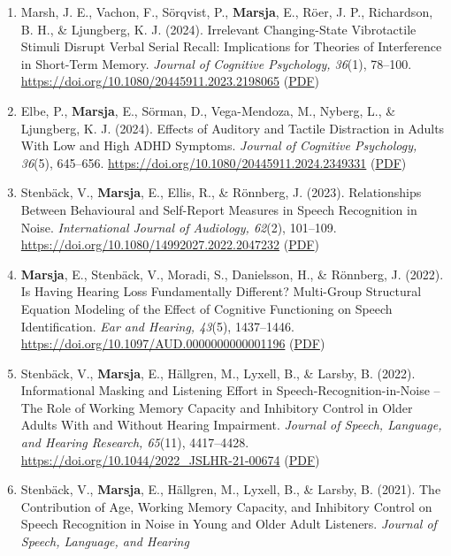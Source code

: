 \documentclass[]{article}
\begin{document}
\begin{enumerate}
  Classification. \emph{Acta Psychologica, 259}, 105461.
  \url{https://doi.org/10.1016/j.actpsy.2025.105461}
  (\href{https://tinyurl.com/spinml}{PDF})
\item
  Marsh, J. E., Vachon, F., Sörqvist, P., \textbf{Marsja}, E., Röer, J.
  P., Richardson, B. H., \& Ljungberg, K. J. (2024). Irrelevant
  Changing-State Vibrotactile Stimuli Disrupt Verbal Serial Recall:
  Implications for Theories of Interference in Short-Term Memory.
  \emph{Journal of Cognitive Psychology, 36}(1), 78--100.
  \url{https://doi.org/10.1080/20445911.2023.2198065}
  (\href{https://tinyurl.com/vibradistr}{PDF})
\item
  Elbe, P., \textbf{Marsja}, E., Sörman, D., Vega-Mendoza, M., Nyberg,
  L., \& Ljungberg, K. J. (2024). Effects of Auditory and Tactile
  Distraction in Adults With Low and High ADHD Symptoms. \emph{Journal
  of Cognitive Psychology, 36}(5), 645--656.
  \url{https://doi.org/10.1080/20445911.2024.2349331}
  (\href{https://tinyurl.com/elbevibra}{PDF})
\item
  Stenbäck, V., \textbf{Marsja}, E., Ellis, R., \& Rönnberg, J. (2023).
  Relationships Between Behavioural and Self-Report Measures in Speech
  Recognition in Noise. \emph{International Journal of Audiology,
  62}(2), 101--109. \url{https://doi.org/10.1080/14992027.2022.2047232}
  (\href{https://tinyurl.com/IJA22}{PDF})
\item
  \textbf{Marsja}, E., Stenbäck, V., Moradi, S., Danielsson, H., \&
  Rönnberg, J. (2022). Is Having Hearing Loss Fundamentally Different?
  Multi-Group Structural Equation Modeling of the Effect of Cognitive
  Functioning on Speech Identification. \emph{Ear and Hearing, 43}(5),
  1437--1446. \url{https://doi.org/10.1097/AUD.0000000000001196}
  (\href{https://tinyurl.com/eandhsem}{PDF})
\item
  Stenbäck, V., \textbf{Marsja}, E., Hällgren, M., Lyxell, B., \&
  Larsby, B. (2022). Informational Masking and Listening Effort in
  Speech-Recognition-in-Noise -- The Role of Working Memory Capacity and
  Inhibitory Control in Older Adults With and Without Hearing
  Impairment. \emph{Journal of Speech, Language, and Hearing Research,
  65}(11), 4417--4428. \url{https://doi.org/10.1044/2022_JSLHR-21-00674}
  (\href{https://tinyurl.com/SPIN22b}{PDF})
\item
  Stenbäck, V., \textbf{Marsja}, E., Hällgren, M., Lyxell, B., \&
  Larsby, B. (2021). The Contribution of Age, Working Memory Capacity,
  and Inhibitory Control on Speech Recognition in Noise in Young and
  Older Adult Listeners. \emph{Journal of Speech, Language, and Hearing
}
\end{enumerate}
\end{document}
